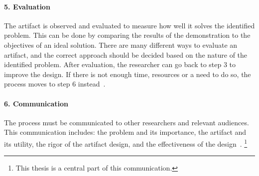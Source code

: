 \paragraph{5. Evaluation}
The artifact is observed and evaluated to measure how well it solves the identified problem.
This can be done by comparing the results of the demonstration to the  objectives of an ideal solution.
There are many different ways to evaluate an artifact, and the correct approach should be decided based on the nature of the identified problem.
After evaluation, the researcher can go back to step 3 to improve the design.
If there is not enough time, resources or a need to do so, the process moves to step 6 instead~\cite[p.~30]{alanhevnerDesignResearchInformation2010}.

\paragraph{6. Communication}
The process must be communicated to other researchers and relevant audiences.
This communication includes: the problem and its importance, the artifact and its utility, the rigor of the artifact design, and the effectiveness of the design~\cite[p.~30]{alanhevnerDesignResearchInformation2010}.%
\footnote{This thesis is a central part of this communication.}


